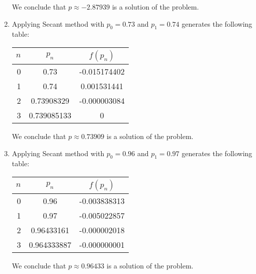 \documentclass[../../../../Assignments]{subfiles}
\begin{document}
\begin{solution}
\begin{enumerate}[label= \alph*)]
            We conclude that \(p \approx \num{-2.87939}\) is a solution of the
            problem.

        \item Applying Secant method with \(p_0 = \num{0.73}\) and \(p_1 =
            \num{0.74}\) generates the following table:

            \begin{table}[H]
                \centering
                \begin{tabular}{r S[table-format=1.9] S[table-format=-1.9]}
                    \toprule
                    \(n\)  &    {\(p_n\)}   &  {\(f(p_n)\)}  \\
                      &   0.73         &  -0.015174402  \\
                        1  &   0.74         &   0.001531441  \\
                        2  &   0.73908329   &  -0.000003084  \\
                        3  &   0.739085133  &   0            \\
                    \bottomrule
                \end{tabular}
            \end{table}

            We conclude that \(p \approx \num{0.73909}\) is a solution of the
            problem.

        \item Applying Secant method with \(p_0 = \num{0.96}\) and \(p_1 =
            \num{0.97}\) generates the following table:

            \begin{table}[H]
                \centering
                \begin{tabular}{r S[table-format=1.9] S[table-format=-1.9]}
                    \toprule
                    \(n\)  &   {\(p_n\)}   &  {\(f(p_n)\)}  \\
                      &  0.96         &  -0.003838313  \\
                        1  &  0.97         &  -0.005022857  \\
                        2  &  0.96433161   &  -0.000002018  \\
                        3  &  0.964333887  &  -0.000000001  \\
                    \bottomrule
                \end{tabular}
            \end{table}

            We conclude that \(p \approx \num{0.96433}\) is a solution of the
            problem.
    \end{enumerate}
\end{solution}
\end{document}
